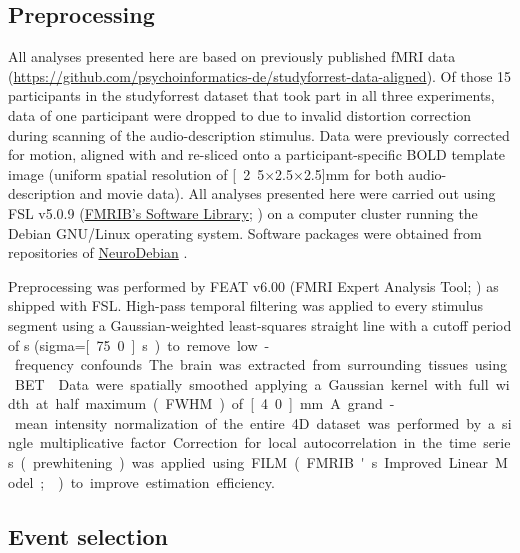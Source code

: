 \documentclass[english]{article}
\begin{document}
\subsection{Preprocessing}

All analyses presented here are based on previously published fMRI data
(\url{https://github.com/psychoinformatics-de/studyforrest-data-aligned}).
Of those 15 participants in the studyforrest dataset that took
part in all three experiments,
data of one participant were dropped to due to invalid distortion correction
during scanning of the audio-description stimulus.
Data were previously corrected for motion, aligned with and re-sliced onto a
participant-specific BOLD template image \citep{sengupta2016extension}
(uniform spatial resolution of \unit[2.5$\times$2.5$\times$2.5]{mm} for both
audio-description and movie data).
All analyses presented here were carried out using
FSL v5.0.9 (\href{https://www.fmrib.ox.ac.uk/fsl}{FMRIB's Software Library};
\citep{smith2004fsl}) on a computer cluster running the Debian GNU/Linux
operating system. Software packages were obtained from repositories of
\href{http://neuro.debian.net}{NeuroDebian} \citep{halchenko2012open}.

Preprocessing was performed by FEAT v6.00 (FMRI Expert Analysis Tool;
\citep{woolrich2001autocorr}) as shipped with FSL.
High-pass temporal filtering was applied to every stimulus segment using a
Gaussian-weighted least-squares straight line with a cutoff period of
\unit[150]{s} (sigma=\unit[75.0]{s}) to remove low-frequency confounds.
The brain was extracted from surrounding tissues using BET \citep{smith2002bet}.
Data were spatially smoothed applying a Gaussian kernel with full width at half
maximum (FWHM) of \unit[4.0]{mm}.
A grand-mean intensity normalization of the entire 4D dataset was performed by a
single multiplicative factor.
Correction for local autocorrelation in the time series (prewhitening) was
applied using FILM (FMRIB's Improved Linear Model; \citep{woolrich2001autocorr})
to improve estimation efficiency.


\subsection{Event selection} \label{rationale}
\end{document}
